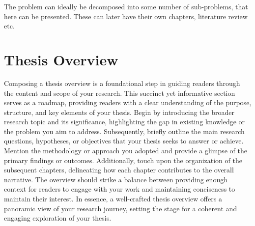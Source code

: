 The problem can ideally be decomposed into some number of sub-problems, that here can be presented. These can later have their own chapters, literature review etc.
\section{Thesis Overview}\label{sec:intro-thesis-overview}

Composing a thesis overview is a foundational step in guiding readers through the content and scope of your research. This succinct yet informative section serves as a roadmap, providing readers with a clear understanding of the purpose, structure, and key elements of your thesis. Begin by introducing the broader research topic and its significance, highlighting the gap in existing knowledge or the problem you aim to address. Subsequently, briefly outline the main research questions, hypotheses, or objectives that your thesis seeks to answer or achieve. Mention the methodology or approach you adopted and provide a glimpse of the primary findings or outcomes. Additionally, touch upon the organization of the subsequent chapters, delineating how each chapter contributes to the overall narrative. The overview should strike a balance between providing enough context for readers to engage with your work and maintaining conciseness to maintain their interest. In essence, a well-crafted thesis overview offers a panoramic view of your research journey, setting the stage for a coherent and engaging exploration of your thesis.